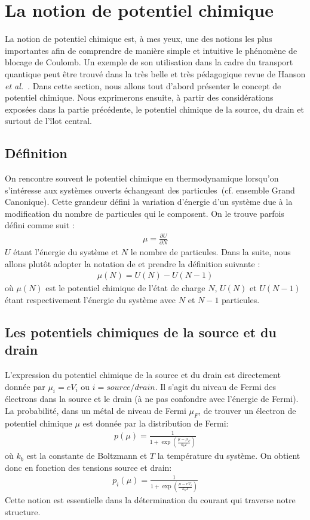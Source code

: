 \section{La notion de potentiel chimique}
La notion de potentiel chimique est, à mes yeux, une des notions les plus importantes afin de comprendre de manière simple et intuitive le phénomène de blocage de Coulomb. Un exemple de son utilisation dans la cadre du transport quantique peut \^etre trouvé dans la très belle et très pédagogique revue de Hanson \textit{et al.}~\cite{Hanson2007}. Dans cette section, nous allons tout d'abord présenter le concept de potentiel chimique. Nous exprimerons ensuite, à partir des considérations exposées dans la partie précédente, le potentiel chimique de la source, du drain et surtout de l'\^ilot central.

\subsection{Définition}

On rencontre souvent le potentiel chimique en thermodynamique lorsqu'on s'intéresse aux systèmes ouverts échangeant des particules~(cf. ensemble Grand Canonique). Cette grandeur défini la variation d'énergie d'un système due à la modification du nombre de particules qui le composent. On le trouve parfois défini comme suit :
\begin{eqnarray}
\mu = \frac{\partial U}{\partial N} \nonumber
\end{eqnarray}
$U$ étant l'énergie du système et $N$ le nombre de particules. Dans la suite, nous allons plut\^ot adopter la notation de \cite{Hanson2007} et prendre la définition suivante :
\begin{eqnarray}
\mu(N) = U(N) - U(N-1)
\label{potchimeq}
\end{eqnarray}
où $\mu(N)$ est le potentiel chimique de l'état de charge $N$, $U(N)$ et $U(N-1)$ étant respectivement l'énergie du système avec $N$ et $N-1$ particules.


\subsection{Les potentiels chimiques de la source et du drain}
L'expression du potentiel chimique de la source et du drain est directement donnée par $\mu_i = e V_i$ ou $i=source/drain$. Il s'agit du niveau de Fermi des électrons dans la source et le drain (à ne pas confondre avec l'énergie de Fermi). La probabilité, dans un métal de niveau de Fermi $\mu_F$, de trouver un électron de potentiel chimique $\mu$ est donnée par la distribution de Fermi:
\begin{eqnarray}
p(\mu) = \frac{1}{1 + \exp{(\frac{\mu - \mu_F}{k_bT})}} \nonumber
\end{eqnarray}
où $k_b$ est la constante de Boltzmann et $T$ la température du système. On obtient donc en fonction des tensions source et drain:
\begin{eqnarray}
p_i(\mu) = \frac{1}{1 + \exp{(\frac{\mu - eV_i}{k_bT})}}
\end{eqnarray}
Cette notion est essentielle dans la détermination du courant qui traverse notre structure.

